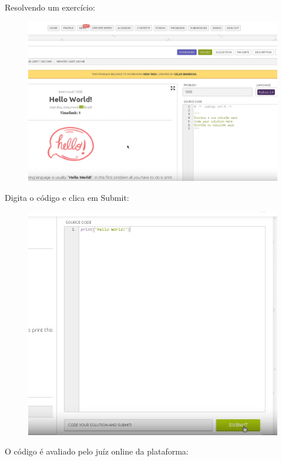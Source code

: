 \begin{enumerate}
    Resolvendo um exercício:

    \begin{figure}[H]
        \centering
            \includegraphics[scale=0.35]{pictures/apendices/apendice_b_20.png}
    \end{figure}

    Digita o código e clica em Submit:

    \begin{figure}[H]
        \centering
            \includegraphics[scale=0.425]{pictures/apendices/apendice_b_22.png}
    \end{figure}

    O código é avaliado pelo juíz online da plataforma:


\end{enumerate}
